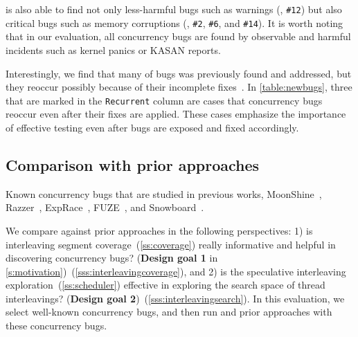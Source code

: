 \sys is also able to find not only less-harmful bugs such as warnings
(\eg, \texttt{\#12}) but also critical bugs such as memory corruptions
(\eg, \texttt{\#2}, \texttt{\#6}, and \texttt{\#14}).
%
It is worth noting that in our evaluation, all concurrency bugs are
found by observable and harmful incidents such as kernel panics or
KASAN reports.
%

Interestingly, we find that many of bugs was previously found and
addressed, but they reoccur possibly because of their incomplete
fixes~\cite{learningfrommistakes}.
%
In \autoref{table:newbugs}, three that are marked in the
\texttt{Recurrent} column are cases that concurrency bugs reoccur even
after their fixes are applied.
%
These cases emphasize the importance of effective testing even after
bugs are exposed and fixed accordingly.





\subsection{Comparison with prior approaches}
\label{ss:comparison}

\begin{table}[t]
  
  \centering
  \caption{Known concurrency bugs that are studied in previous works,
    MoonShine~\cite{moonshine}, Razzer~\cite{razzer},
    ExpRace~\cite{exprace}, FUZE~\cite{fuze}, and
    Snowboard~\cite{snowboard}.}
  \label{table:knownbugs}
\end{table}

We compare \sys against prior approaches in the following
perspectives: 1) is interleaving segment
coverage~(\autoref{ss:coverage}) really informative and helpful in
discovering concurrency bugs?  (\textbf{Design goal 1} in
\autoref{s:motivation})~(\autoref{sss:interleavingcoverage}), and
%
2) is the speculative interleaving
exploration~(\autoref{ss:scheduler}) effective in exploring the search
space of thread interleavings? (\textbf{Design goal
  2})~(\autoref{sss:interleavingsearch}).
%
In this evaluation, we select well-known concurrency bugs, and then
run \sys and prior approaches with these concurrency bugs.




